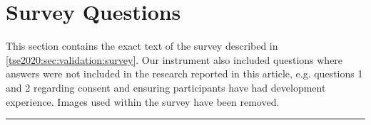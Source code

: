 \begin{enumerate}[label={[S\arabic*]}]\footnotesize
\item {}
\item {}
\item {}
\item {}
\item {}
\item {}
\item {}
\item {}
\item {}
\item {}
\item {}
\item {}
\item {}
\item {}
\item {}
\item {}
\item {}
\item {}
\item {}
\item {}
\item {}
\end{enumerate}

\clearpage
\section{Survey Questions}\label{tse2020:sec:survey}

\def\AgreementScale{{\footnotesize \textit{[Strongly agree, Somewhat agree, Neither agree nor disagree, Somewhat disagree, Strongly disagree]}\bigskip}}

\noindent
This section contains the exact text of the survey described in \cref{tse2020:sec:validation:survey}. Our instrument also included questions where answers were not included in the research reported in this article, e.g. questions 1 and 2 regarding consent and ensuring participants have had development experience. Images used within the survey have been removed.

\bigskip
\hrule\sffamily\small

